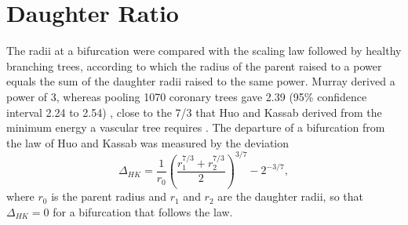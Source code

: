 \section{Daughter Ratio}
\label{sec:method-ratio}

The radii at a bifurcation were compared with the scaling law followed by healthy branching trees,
according to which the radius of the parent raised to a power equals the sum of the daughter radii
raised to the same power.
Murray derived a power of 3, whereas pooling 1070 coronary trees gave 2.39 (95\% confidence interval
2.24 to 2.54) \cite{taylor2024murray}, close to the 7/3 that Huo and Kassab derived from the minimum
energy a vascular tree requires \cite{huo2012scaling}.
The departure of a bifurcation from the law of Huo and Kassab was measured by the deviation
\begin{equation}
  \Delta_{HK} = \frac{1}{r_0}\left(\frac{r_1^{7/3} + r_2^{7/3}}{2}\right)^{3/7} - 2^{-3/7},
  \label{eq:method-hk}
\end{equation}
where $r_0$ is the parent radius and $r_1$ and $r_2$ are the daughter radii, so that
$\Delta_{HK} = 0$ for a bifurcation that follows the law.
